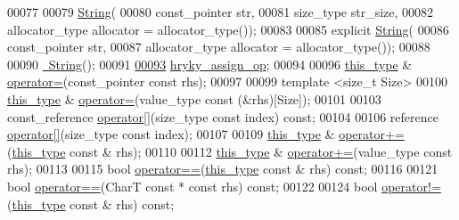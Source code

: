 \begin{DoxyCode}
00077 
00079     \hyperlink{classhryky_1_1_string_ad60595ccc01ad3a9c1c32b9c7eb0a115}{String}(
00080         const\_pointer str,
00081         size\_type str\_size,
00082         allocator\_type allocator = allocator\_type());
00083 
00085     \textcolor{keyword}{explicit} \hyperlink{classhryky_1_1_string_ad60595ccc01ad3a9c1c32b9c7eb0a115}{String}(
00086         const\_pointer str,
00087         allocator\_type allocator = allocator\_type());
00088 
00090     \hyperlink{classhryky_1_1_string_aad9c7884c7afd2b4543b3b90d1c7e0b2}{~String}();
00091 
\hypertarget{string_8h_source_l00093}{}\hyperlink{classhryky_1_1_string_a445f0d882e66842a32e855881278cd64}{00093}     \hyperlink{classhryky_1_1_string_a445f0d882e66842a32e855881278cd64}{hryky_assign_op};
00094 
00096     \hyperlink{classhryky_1_1_string}{this_type} & \hyperlink{classhryky_1_1_string_a65d2ec00521600df0d838c8b4b4ee61e}{operator=}(const\_pointer \textcolor{keyword}{const} rhs);
00097 
00099     \textcolor{keyword}{template} <\textcolor{keywordtype}{size\_t} Size>
00100     \hyperlink{classhryky_1_1_string}{this_type} & \hyperlink{classhryky_1_1_string_a65d2ec00521600df0d838c8b4b4ee61e}{operator=}(value\_type \textcolor{keyword}{const} (&rhs)[Size]);
00101 
00103     const\_reference \hyperlink{classhryky_1_1_string_ae4170a6bb4266d9185c88560014ca7fe}{operator[]}(size\_type \textcolor{keyword}{const} index) \textcolor{keyword}{const};
00104 
00106     reference \hyperlink{classhryky_1_1_string_ae4170a6bb4266d9185c88560014ca7fe}{operator[]}(size\_type \textcolor{keyword}{const} index);
00107 
00109     \hyperlink{classhryky_1_1_string}{this_type} & \hyperlink{classhryky_1_1_string_a96d9ab83efd313311b3dc6f659b16027}{operator+=}(\hyperlink{classhryky_1_1_string}{this_type} \textcolor{keyword}{const} & rhs);
00110 
00112     \hyperlink{classhryky_1_1_string}{this_type} & \hyperlink{classhryky_1_1_string_a96d9ab83efd313311b3dc6f659b16027}{operator+=}(value\_type \textcolor{keyword}{const} rhs);
00113 
00115     \textcolor{keywordtype}{bool} \hyperlink{classhryky_1_1_string_a4480f7768eb5a9afce82696513af50e9}{operator==}(\hyperlink{classhryky_1_1_string}{this_type} \textcolor{keyword}{const} & rhs) \textcolor{keyword}{const};
00116 
00121     \textcolor{keywordtype}{bool} \hyperlink{classhryky_1_1_string_a4480f7768eb5a9afce82696513af50e9}{operator==}(CharT \textcolor{keyword}{const} * \textcolor{keyword}{const} rhs) \textcolor{keyword}{const};
00122 
00124     \textcolor{keywordtype}{bool} \hyperlink{classhryky_1_1_string_aab264bc0bc8f1a6c43d44dfe5ccb2b4f}{operator!=}(\hyperlink{classhryky_1_1_string}{this_type} \textcolor{keyword}{const} & rhs) \textcolor{keyword}{const};

\end{DoxyCode}
